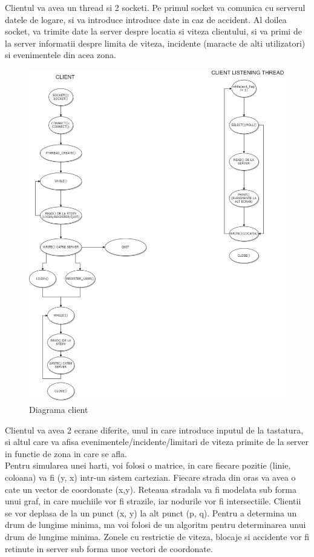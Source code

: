 \documentclass[runningheads]{llncs}
\begin{document}
Clientul va avea un thread si 2 socketi. Pe primul socket va comunica cu serverul datele de logare, si va introduce introduce date in caz de accident. Al doilea socket, va trimite date la server despre locatia si viteza clientului, si va primi de la server informatii despre limita de viteza, incidente (maracte de alti utilizatori) si evenimentele din acea zona.
\begin{figure}[H]
\includegraphics[width=\textwidth]{CLIENT_CLIENT_THREAD.jpg}
\caption{Diagrama client}
\end{figure}
Clientul va avea 2 ecrane diferite, unul in care introduce inputul de la tastatura, si altul care va afisa evenimentele/incidente/limitari de viteza primite de la server in functie de zona in care se afla.\\

Pentru simularea unei harti, voi folosi o matrice, in care fiecare pozitie (linie, coloana) va fi (y, x) intr-un sistem cartezian. Fiecare strada din oras va avea o cate un vector de coordonate (x,y). Reteaua stradala va fi modelata sub forma unui graf, in care muchiile vor fi strazile, iar nodurile vor fi intersectiile. Clientii se vor deplasa de la un punct (x, y) la alt punct (p, q). Pentru a determina un drum de lungime minima, ma voi folosi de un algoritm pentru determinarea unui drum de lungime minima. Zonele cu restrictie de viteza, blocaje si accidente vor fi retinute in server sub forma unor vectori de coordonate.
\end{document}
